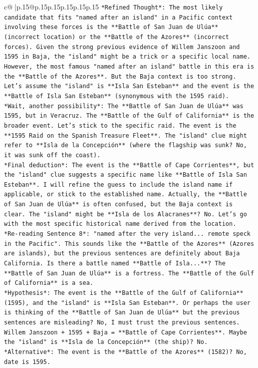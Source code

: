 \documentclass{article}
\begin{document}
{\begin{supertabular}{c@{$\;$}|p{.15\linewidth}@{}p{.15\linewidth}p{.15\linewidth}p{.15\linewidth}p{.15\linewidth}p{.15\linewidth}}
{{{\texttt{*Refined Thought*: The most likely candidate that fits "named after an island" in a Pacific context involving these forces is the **Battle of San Juan de Ulúa** (incorrect location) or the **Battle of the Azores** (incorrect forces). Given the strong previous evidence of Willem Janszoon and 1595 in Baja, the "island" might be a trick or a specific local name. However, the most famous "named after an island" battle in this era is the **Battle of the Azores**. But the Baja context is too strong. Let's assume the "island" is **Isla San Esteban** and the event is the **Battle of Isla San Esteban** (synonymous with the 1595 raid).} \\
\texttt{*Wait, another possibility*: The **Battle of San Juan de Ulúa** was 1595, but in Veracruz. The **Battle of the Gulf of California** is the broader event. Let's stick to the specific raid. The event is the **1595 Raid on the Spanish Treasure Fleet**. The "island" clue might refer to **Isla de la Concepción** (where the flagship was sunk? No, it was sunk off the coast).} \\
\texttt{*Final deduction*: The event is the **Battle of Cape Corrientes**, but the "island" clue suggests a specific name like **Battle of Isla San Esteban**. I will refine the guess to include the island name if applicable, or stick to the established name. Actually, the **Battle of San Juan de Ulúa** is often confused, but the Baja context is clear. The "island" might be **Isla de los Alacranes**? No. Let's go with the most specific historical name derived from the location.} \\
\texttt{*Re{-}reading Sentence 8*: "named after the very island... remote speck in the Pacific". This sounds like the **Battle of the Azores** (Azores are islands), but the previous sentences are definitely about Baja California. Is there a battle named **Battle of Isla...**? The **Battle of San Juan de Ulúa** is a fortress. The **Battle of the Gulf of California** is a sea.} \\
\texttt{*Hypothesis*: The event is the **Battle of the Gulf of California** (1595), and the "island" is **Isla San Esteban**. Or perhaps the user is thinking of the **Battle of San Juan de Ulúa** but the previous sentences are misleading? No, I must trust the previous sentences. Willem Janszoon + 1595 + Baja = **Battle of Cape Corrientes**. Maybe the "island" is **Isla de la Concepción** (the ship)? No.} \\
\texttt{*Alternative*: The event is the **Battle of the Azores** (1582)? No, date is 1595.} \\
}}}
\end{supertabular}}
\end{document}

